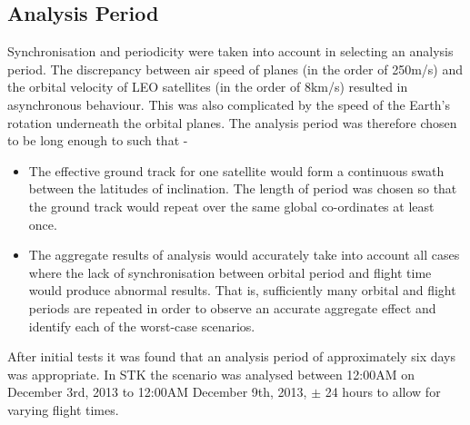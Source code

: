 \subsection{Analysis Period} \label{sec:analysis_period}
Synchronisation and periodicity were taken into account in selecting an analysis period. The discrepancy between air speed of planes (in the order of 250m/s) and the orbital velocity of LEO satellites (in the order of 8km/s) resulted in asynchronous behaviour. This was also complicated by the speed of the Earth's rotation underneath the orbital planes. The analysis period was therefore chosen to be long enough to such that - 
\begin{itemize}
	\item The effective ground track for one satellite would form a continuous swath between the latitudes of inclination. The length of period was chosen so that the ground track would repeat over the same global co-ordinates at least once. 
	\item The aggregate results of analysis would accurately take into account all cases where the lack of synchronisation between orbital period and flight time would produce abnormal results. That is, sufficiently many orbital and flight periods are repeated in order to observe an accurate aggregate effect and identify each of the worst-case scenarios.
\end{itemize} 
After initial tests it was found that an analysis period of approximately six days was appropriate. In STK the scenario was analysed between 12:00AM on December 3rd, 2013 to 12:00AM December 9th, 2013, $\pm$ 24 hours to allow for varying flight times.

